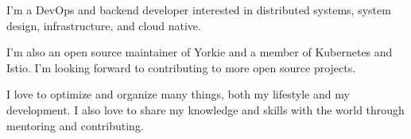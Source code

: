 

\begin{cvparagraph}

I'm a DevOps and backend developer interested in distributed systems, system design, infrastructure, and cloud native.

I'm also an open source maintainer of Yorkie and a member of Kubernetes and Istio. I'm looking forward to contributing to more open source projects.

I love to optimize and organize many things, both my lifestyle and my development. I also love to share my knowledge and skills with the world through mentoring and contributing.
\end{cvparagraph}
